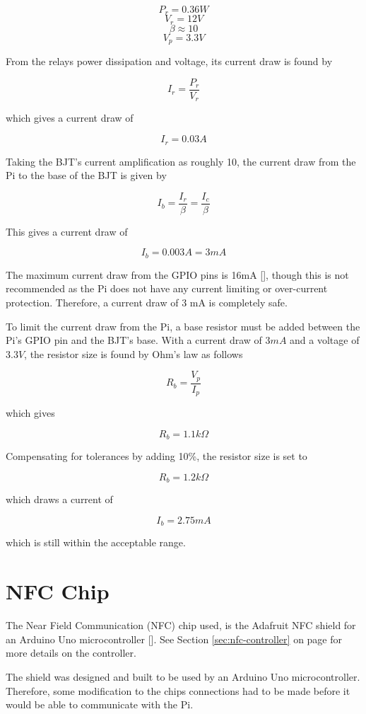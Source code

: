\[ P_{r} = 0.36W\]
\[ V_{r} = 12V\]
\[ \beta \approx 10\]
\[ V_{p} = 3.3V\]

From the relays power dissipation and voltage, its current draw is found by

\[
I_{r} = \frac{P_{r}}{V_{r}}
\]

which gives a current draw of

\[
I_{r} = 0.03A
\]

Taking the BJT's current amplification as roughly 10, the current draw from the Pi to the
base of the BJT is given by

\[
I_{b} = \frac{I_{r}}{\beta} = \frac{I_{c}}{\beta}
\]

This gives a current draw of

\[
I_{b} = 0.003A = 3mA
\]

The maximum current draw from the GPIO pins is 16mA [\cite{website:gpio-specs}], though this is
not recommended as the Pi does not have any current limiting or over-current protection.
Therefore, a current draw of 3 mA is completely safe.

To limit the current draw from the Pi, a base resistor must be added between the Pi's GPIO pin
and the BJT's base. With a current draw of $3mA$ and a voltage of $3.3V$, the resistor size is
found by Ohm's law as follows

\[
R_{b} = \frac{V_{p}}{I_{p}}
\]

which gives

\[
R_{b} = 1.1k\Omega
\]

Compensating for tolerances by adding 10\%, the resistor size is set to

\[R_{b} = 1.2k\Omega\]

which draws a current of 

\[I_{b} = 2.75 mA \]

which is still within the acceptable range.

\section{NFC Chip}

The Near Field Communication (NFC) chip used, is the Adafruit NFC shield for an
Arduino Uno microcontroller [\cite{website:adafruit-nfc}]. See Section
\ref{sec:nfc-controller} on page \pageref{sec:nfc-controller} for more details on the controller.

The shield was designed and built to be used by an Arduino Uno microcontroller.
Therefore, some modification to the chips connections had to be made before it
would be able to communicate with the Pi.

